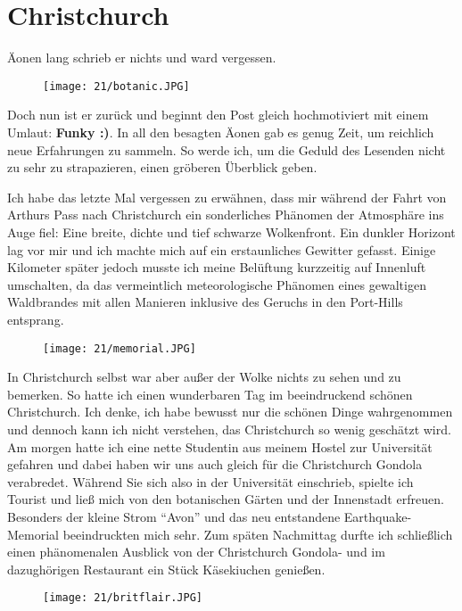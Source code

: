 \chapter{Christchurch}

Äonen lang schrieb er nichts und ward vergessen.

\begin{figure}[h]
  \centering
  \texttt{[image: 21/botanic.JPG]}
\end{figure}
Doch nun ist er zurück und beginnt den Post gleich hochmotiviert mit
einem Umlaut: \textbf{\textbf{Funky :)}}. In all den besagten Äonen gab
es genug Zeit, um reichlich neue Erfahrungen zu sammeln. So werde ich,
um die Geduld des Lesenden nicht zu sehr zu strapazieren, einen gröberen
Überblick geben.

Ich habe das letzte Mal vergessen zu erwähnen, dass mir während der
Fahrt von Arthurs Pass nach Christchurch ein sonderliches Phänomen der
Atmosphäre ins Auge fiel: Eine breite, dichte und tief schwarze
Wolkenfront. Ein dunkler Horizont lag vor mir und ich machte mich auf
ein erstaunliches Gewitter gefasst. Einige Kilometer später jedoch
musste ich meine Belüftung kurzzeitig auf Innenluft umschalten, da das
vermeintlich meteorologische Phänomen eines gewaltigen Waldbrandes mit
allen Manieren inklusive des Geruchs in den Port-Hills entsprang.

\begin{figure}[h]
  \centering
  \texttt{[image: 21/memorial.JPG]}
\end{figure}
In Christchurch selbst war aber außer der Wolke nichts zu sehen und zu
bemerken. So hatte ich einen wunderbaren Tag im beeindruckend schönen
Christchurch. Ich denke, ich habe bewusst nur die schönen Dinge
wahrgenommen und dennoch kann ich nicht verstehen, das Christchurch so
wenig geschätzt wird. Am morgen hatte ich eine nette Studentin aus
meinem Hostel zur Universität gefahren und dabei haben wir uns auch
gleich für die Christchurch Gondola verabredet. Während Sie sich also in
der Universität einschrieb, spielte ich Tourist und ließ mich von den
botanischen Gärten und der Innenstadt erfreuen. Besonders der kleine
Strom ``Avon'' und das neu entstandene Earthquake-Memorial beeindruckten
mich sehr. Zum späten Nachmittag durfte ich schließlich einen
phänomenalen Ausblick von der Christchurch Gondola- und im dazughörigen
Restaurant ein Stück Käsekiuchen genießen.
\begin{figure}[h]
  \centering
  \texttt{[image: 21/britflair.JPG]}
\end{figure}


